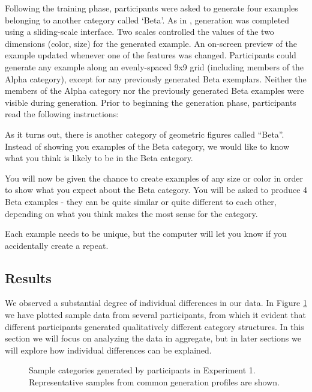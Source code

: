 \documentclass[12pt]{article}
\newcommand\inputpgf[2]{{
\let\pgfimageWithoutPath\pgfimage
\renewcommand{\pgfimage}[2][]{\pgfimageWithoutPath[##1]{#1/##2}}

}}
\begin{document}
\begin{flushleft}
Following the training phase, participants were asked to generate four examples belonging to another category called `Beta'. As in \citet{jern2013probabilistic}, generation was completed using a sliding-scale interface. Two scales controlled the values of the two dimensions (color, size)  for the generated example. An on-screen preview of the example updated whenever one of the features was changed. Participants could generate any example along an evenly-spaced 9x9 grid (including members of the Alpha category), except for any previously generated Beta exemplars. Neither the members of the Alpha category nor the previously generated Beta examples were visible during generation. Prior to beginning the generation phase, participants read the following instructions:

\begin{displayquote}
As it turns out, there is another category of geometric figures called ``Beta''. Instead of showing you examples of the Beta category, we would like to know what you think is likely to be in the Beta category. 

You will now be given the chance to create examples of any size or color in order to show what you expect about the Beta category. You will be asked to produce 4 Beta examples - they can be quite similar or quite different to each other, depending on what you think makes the most sense for the category.

Each example needs to be unique, but the computer will let you know if you accidentally create a repeat.
\end{displayquote}


\subsection{Results}

We observed a substantial degree of individual differences in our data. In Figure \ref{fig:e1-samples} we have plotted sample data from several participants, from which it evident that different participants generated qualitatively different category structures. In this section we will focus on analyzing the data in aggregate, but in later sections we will explore how individual differences can be explained.

\begin{figure}
    \begin{center}
    \inputpgf{figs/}{e1-samples.pgf}
    \caption{Sample categories generated by participants in Experiment 1. Representative samples from common generation profiles are shown.}
    \label{fig:e1-samples}
    \end{center}
\end{figure}


\end{flushleft}
\end{document}

